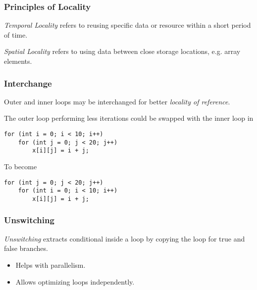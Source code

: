 \subsubsection{Principles of Locality}

\begin{definition}
    \textit{Temporal Locality} refers to reusing specific data or resource within a short period of time.
\end{definition}

\begin{definition}
    \textit{Spatial Locality} refers to using data between close storage locations, e.g. array elements.
\end{definition}

\subsubsection{Interchange}

\begin{definition}[Interchange]
    Outer and inner loops may be interchanged for better \textit{locality of reference}.
\end{definition}

\begin{example}
    The outer loop performing less iterations could be swapped with the inner loop in
    \begin{verbatim}
for (int i = 0; i < 10; i++)
    for (int j = 0; j < 20; j++)
        x[i][j] = i + j;
    \end{verbatim}
    
    To become
    \begin{verbatim}
for (int j = 0; j < 20; j++)
    for (int i = 0; i < 10; i++)
        x[i][j] = i + j;
    \end{verbatim}
\end{example}

\subsubsection{Unswitching}

\begin{definition}[Unswitching]
    \textit{Unswitching} extracts conditional inside a loop by copying the loop for true and false branches.
    \begin{itemize}
        \item Helps with parallelism.
        \item Allows optimizing loops independently.
    \end{itemize}
\end{definition}

